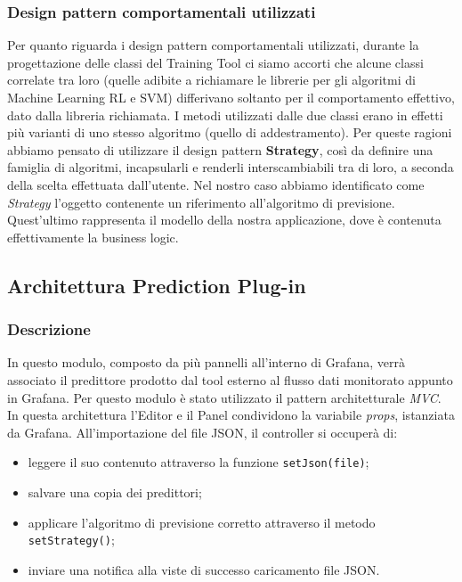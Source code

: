 \subsubsection{Design pattern comportamentali utilizzati}
Per quanto riguarda i design pattern comportamentali utilizzati, durante la progettazione delle classi del Training Tool ci siamo accorti che alcune classi correlate tra loro (quelle adibite a richiamare le librerie per gli algoritmi di Machine Learning RL e SVM) differivano soltanto per il comportamento effettivo, dato dalla libreria richiamata. I metodi utilizzati dalle due classi erano in effetti più varianti di uno stesso algoritmo (quello di addestramento). Per queste ragioni abbiamo pensato di utilizzare il design pattern \textbf{Strategy}, così da definire una famiglia di algoritmi, incapsularli e renderli interscambiabili tra di loro, a seconda della scelta effettuata dall’utente.
Nel nostro caso abbiamo identificato come \textit{Strategy} l’oggetto contenente un riferimento all'algoritmo di previsione.
Quest'ultimo rappresenta il modello della nostra applicazione, dove è contenuta effettivamente la business logic.

\pagebreak
\subsection{Architettura Prediction Plug-in}

\subsubsection{Descrizione}
In questo modulo, composto da più pannelli all'interno di Grafana, verrà associato il predittore prodotto dal tool esterno al flusso dati monitorato appunto in Grafana. Per questo modulo è stato utilizzato il pattern architetturale \textit{MVC}.
In questa architettura l’Editor e il Panel condividono la variabile \textit{props}, istanziata da Grafana. 
All’importazione del file JSON, il controller si occuperà di: \begin{itemize}
\item leggere il suo contenuto attraverso la funzione \texttt{setJson(file)};
\item salvare una copia dei predittori;
\item applicare l'algoritmo di previsione corretto attraverso il metodo \texttt{setStrategy()};
\item inviare una notifica alla viste di successo caricamento file JSON.
\end{itemize}

